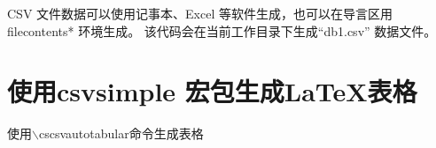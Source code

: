 \documentclass{ctexart}
\begin{document}
	CSV 文件数据可以使用记事本、Excel 等软件生成，也可以在导言区用filecontents* 环境生成。
	该代码会在当前工作目录下生成“db1.csv” 数据文件。
	
\section{使用csvsimple 宏包生成\LaTeX 表格}
	\begin{table}[htb]
		\centering
		\caption{使用$\backslash$cs{csvautotabular}命令生成表格\label{tab01}}
	\end{table}
\end{document}
